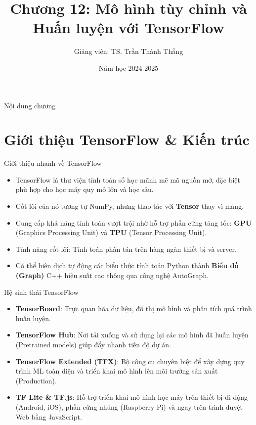 \documentclass[aspectratio=169]{beamer}
\title[Chương 12]{Chương 12: Mô hình tùy chỉnh và Huấn luyện với TensorFlow}
\author{Giảng viên: TS. Trần Thành Thắng}
\institute{Đại học Đông Á}
\date{Năm học 2024-2025}
\begin{document}
\begin{frame}
    \titlepage
\end{frame}

\begin{frame}{Nội dung chương}
    \tableofcontents
\end{frame}

\section{Giới thiệu TensorFlow \& Kiến trúc}

\begin{frame}{Giới thiệu nhanh về TensorFlow}
    \begin{itemize}
        \item TensorFlow là thư viện tính toán số học mãnh mẽ mã nguồn mở, đặc biệt phù hợp cho học máy quy mô lớn và học sâu.
        \item Cốt lõi của nó tương tự NumPy, nhưng thao tác với \textbf{Tensor} thay vì mảng.
        \item Cung cấp khả năng tính toán vượt trội nhờ hỗ trợ phần cứng tăng tốc: \textbf{GPU} (Graphics Processing Unit) và \textbf{TPU} (Tensor Processing Unit).
        \item Tính năng cốt lõi: Tính toán phân tán trên hàng ngàn thiết bị và server.
        \item Có thể biên dịch tự động các biểu thức tính toán Python thành \textbf{Biểu đồ (Graph)} C++ hiệu suất cao thông qua công nghệ AutoGraph.
    \end{itemize}
\end{frame}

\begin{frame}{Hệ sinh thái TensorFlow}
    \begin{itemize}
        \item \textbf{TensorBoard}: Trực quan hóa dữ liệu, đồ thị mô hình và phân tích quá trình huấn luyện.
        \item \textbf{TensorFlow Hub}: Nơi tải xuống và sử dụng lại các mô hình đã huấn luyện (Pretrained models) giúp đẩy nhanh tiến độ dự án.
        \item \textbf{TensorFlow Extended (TFX)}: Bộ công cụ chuyên biệt để xây dựng quy trình ML toàn diện và triển khai mô hình lên môi trường sản xuất (Production).
        \item \textbf{TF Lite \& TF.js}: Hỗ trợ triển khai mô hình học máy trên thiết bị di động (Android, iOS), phần cứng nhúng (Raspberry Pi) và ngay trên trình duyệt Web bằng JavaScript.
    \end{itemize}
\end{frame}
\end{document}

